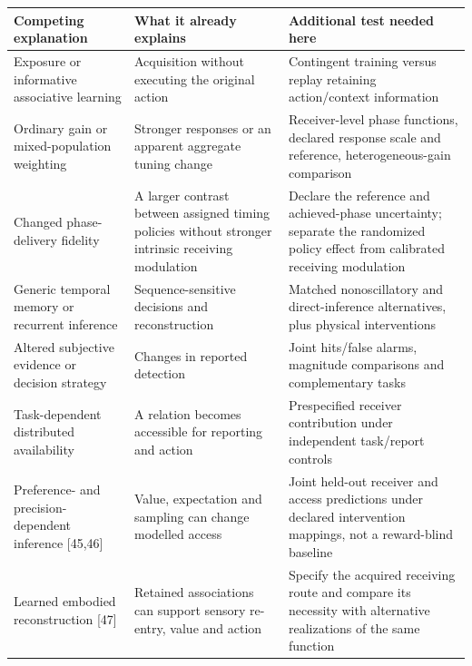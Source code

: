\documentclass[
  american,
  11pt,
  letterpaper,
]{article}
\newcounter{none} %
\begin{document}
{\def\LTcaptype{none} %
\begin{longtable}[]{@{}
  >{\raggedright\arraybackslash}p{}
  >{\raggedright\arraybackslash}p{}
  >{\raggedright\arraybackslash}p{}@{}}
\toprule\noalign{}
\begin{minipage}[b]{\linewidth}\raggedright
Competing explanation
\end{minipage} & \begin{minipage}[b]{\linewidth}\raggedright
What it already explains
\end{minipage} & \begin{minipage}[b]{\linewidth}\raggedright
Additional test needed here
\end{minipage} \\
\midrule\noalign{}
\endhead
\bottomrule\noalign{}
\endlastfoot
Exposure or informative associative learning & Acquisition without executing the original action & Contingent training versus replay retaining action/context information \\
Ordinary gain or mixed-population weighting & Stronger responses or an apparent aggregate tuning change & Receiver-level phase functions, declared response scale and reference, heterogeneous-gain comparison \\
Changed phase-delivery fidelity & A larger contrast between assigned timing policies without stronger intrinsic receiving modulation & Declare the reference and achieved-phase uncertainty; separate the randomized policy effect from calibrated receiving modulation \\
Generic temporal memory or recurrent inference & Sequence-sensitive decisions and reconstruction & Matched nonoscillatory and direct-inference alternatives, plus physical interventions \\
Altered subjective evidence or decision strategy & Changes in reported detection & Joint hits/false alarms, magnitude comparisons and complementary tasks \\
Task-dependent distributed availability & A relation becomes accessible for reporting and action & Prespecified receiver contribution under independent task/report controls \\
Preference- and precision-dependent inference {[}45,46{]} & Value, expectation and sampling can change modelled access & Joint held-out receiver and access predictions under declared intervention mappings, not a reward-blind baseline \\
Learned embodied reconstruction {[}47{]} & Retained associations can support sensory re-entry, value and action & Specify the acquired receiving route and compare its necessity with alternative realizations of the same function \\
\end{longtable}
}
\end{document}
